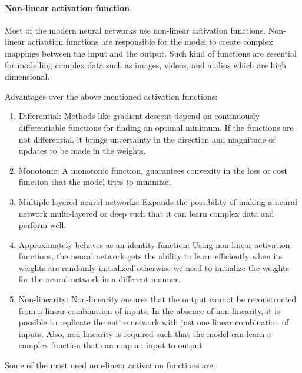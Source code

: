 \paragraph{Non-linear activation function}

Most of the modern neural networks use non-linear activation functions. Non-linear activation functions are responsible for the model to create complex mappings between the input and the output. Such kind of functions are essential for modelling complex data such as images, videos, and audios which are high dimensional.

\par
Advantages over the above mentioned activation functions:
\begin{enumerate}
   \item Differential: Methods like gradient descent depend on continuously differentiable functions for finding an optimal minimum. If the functions are not differential, it brings uncertainty in the direction and magnitude of updates to be made in the weights.
    \item  Monotonic: A monotonic function, guarantees convexity in the loss or cost function that the model tries to minimize. 
    \item Multiple layered neural networks: Expands the possibility of making a neural network multi-layered or deep such that it can learn complex data and perform well.
    \item Approximately behaves as an identity function: Using non-linear activation functions, the neural network gets the ability to learn efficiently when its weights are randomly initialized otherwise we need to initialize the weights for the neural network in a different manner.
    \item Non-linearity: Non-linearity ensures that the output cannot be reconstructed from a linear combination of inputs. In the absence of non-linearity, it is possible to replicate the entire network with just one linear combination of inputs. Also, non-linearity is required such that the model can learn a complex function that can map an input to output 
\end{enumerate}

Some of the most used non-linear activation functions are:

